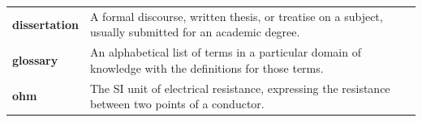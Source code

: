 
\noindent
\begin{tabular}{@{}p{3.8cm} p{11.7cm}@{}}
    \textbf{dissertation} & A formal discourse, written thesis, or treatise on a subject, usually submitted for an academic degree. \\[0.8\baselineskip]
    \textbf{glossary}     & An alphabetical list of terms in a particular domain of knowledge with the definitions for those terms. \\[0.8\baselineskip]
    \textbf{ohm}          & The SI unit of electrical resistance, expressing the resistance between two points of a conductor. \\
\end{tabular}
